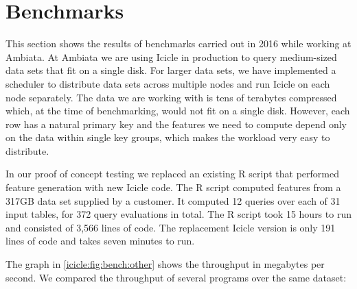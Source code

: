 \section{Benchmarks}
\label{icicle:s:Benchmarks}


This section shows the results of benchmarks carried out in 2016 while working at Ambiata.
At Ambiata we are using Icicle in production to query medium-sized data sets that fit on a single disk.
For larger data sets, we have implemented a scheduler to distribute data sets across multiple nodes and run Icicle on each node separately.
The data we are working with is tens of terabytes compressed which, at the time of benchmarking, would not fit on a single disk.
However, each row has a natural primary key and the features we need to compute depend only on the data within single key groups, which makes the workload very easy to distribute.


In our proof of concept testing we replaced an existing R script that performed feature generation with new Icicle code.
The R script computed features from a 317GB data set supplied by a customer.
It computed 12 queries over each of 31 input tables, for 372 query evaluations in total.
The R script took 15 hours to run and consisted of 3,566 lines of code.
The replacement Icicle version is only 191 lines of code and takes seven minutes to run.

The graph in \cref{icicle:fig:bench:other} shows the throughput in megabytes per second.
We compared the throughput of several programs over the same dataset:

